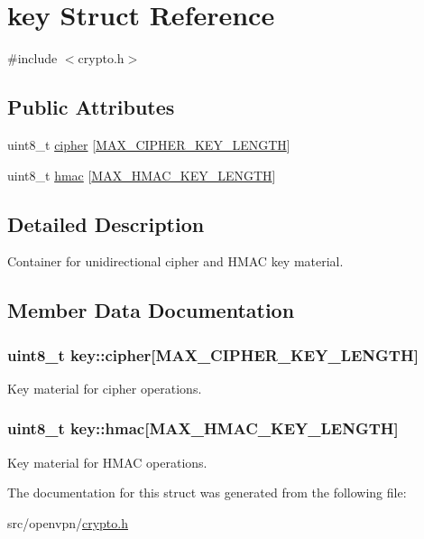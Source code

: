 \hypertarget{structkey}{}\section{key Struct Reference}
\label{structkey}


{\ttfamily \#include $<$crypto.\+h$>$}

\subsection*{Public Attributes}
\begin{DoxyCompactItemize}
\item 
uint8\+\_\+t \hyperlink{structkey_a94ff5232b6e56df51d126b8695a9413c}{cipher} \mbox{[}\hyperlink{crypto__backend_8h_a5ecba19b3b19dd1317e0fad83cfcd414}{M\+A\+X\+\_\+\+C\+I\+P\+H\+E\+R\+\_\+\+K\+E\+Y\+\_\+\+L\+E\+N\+G\+T\+H}\mbox{]}
\item 
uint8\+\_\+t \hyperlink{structkey_a9cdc2579088a9fd78f0484a3e56a5899}{hmac} \mbox{[}\hyperlink{crypto__backend_8h_a9ce521546cb78acc7159459c101aa46b}{M\+A\+X\+\_\+\+H\+M\+A\+C\+\_\+\+K\+E\+Y\+\_\+\+L\+E\+N\+G\+T\+H}\mbox{]}
\end{DoxyCompactItemize}


\subsection{Detailed Description}
Container for unidirectional cipher and H\+M\+A\+C key material. 

\subsection{Member Data Documentation}
\hypertarget{structkey_a94ff5232b6e56df51d126b8695a9413c}{}
\subsubsection[{cipher}]{\setlength{\rightskip}{0pt plus 5cm}uint8\+\_\+t key\+::cipher\mbox{[}{\bf M\+A\+X\+\_\+\+C\+I\+P\+H\+E\+R\+\_\+\+K\+E\+Y\+\_\+\+L\+E\+N\+G\+T\+H}\mbox{]}}\label{structkey_a94ff5232b6e56df51d126b8695a9413c}
Key material for cipher operations. \hypertarget{structkey_a9cdc2579088a9fd78f0484a3e56a5899}{}
\subsubsection[{hmac}]{\setlength{\rightskip}{0pt plus 5cm}uint8\+\_\+t key\+::hmac\mbox{[}{\bf M\+A\+X\+\_\+\+H\+M\+A\+C\+\_\+\+K\+E\+Y\+\_\+\+L\+E\+N\+G\+T\+H}\mbox{]}}\label{structkey_a9cdc2579088a9fd78f0484a3e56a5899}
Key material for H\+M\+A\+C operations. 

The documentation for this struct was generated from the following file\+:\begin{DoxyCompactItemize}
\item 
src/openvpn/\hyperlink{crypto_8h}{crypto.\+h}\end{DoxyCompactItemize}
